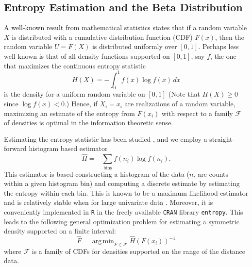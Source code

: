 \documentclass[12pt]{amsart}
\DeclareMathOperator*{\argmin}{arg\,min}
\renewcommand{\hat}{\widehat}
\begin{document}
\begin{multicols}{2}
\section{Entropy Estimation and the Beta Distribution} 
A well-known result from mathematical statistics states that if a random variable $X$ is distributed with a cumulative distribution function (CDF) $F(x)$, then the random variable $U=F(X)$ is distributed uniformly over $[0,1]$. 
Perhaps less well known is that of all density functions supported on $[0,1]$, say $f$, the one that maximizes the continuous entropy statistic 
\begin{equation}
  H(X) = -\int_{0}^1 f(x) \log f(x)\,dx
  \label{continuous_entropy}
\end{equation}
is the density for a uniform random variable on $[0,1]$ \cite{cover2006elements} (Note that $H(X)\ge0$ since $\log f(x) < 0$.)   
Hence, if $X_i=x_i$ are realizations of a random variable, maximizing an estimate of the entropy from $F(x_i)$ with respect to a family $\mathcal F$ of densities is optimal in the information theoretic sense.
 
Estimating the entropy statistic has been studied \cite{cover2006elements}, and we employ a straight-forward histogram based estimator
\begin{equation}
  \widehat H = -\sum_{\mathrm{bins}} f(n_i) \log f(n_i).
  \label{entropy}
\end{equation}
This estimator is based constructing a histogram of the data ($n_i$ are counts within a given histogram bin) and computing a discrete estimate by estimating the entropy within each bin.
This is known to be a maximum likelihood estimator and is relatively stable when for large univariate data \cite{cover2006elements}. 
Moreover, it is conveniently implemented in \texttt R in the freely available \texttt{CRAN} library \texttt{entropy}. 
This leads to the following general optimization problem for estimating a symmetric density supported on a finite interval:
\begin{equation}
  \hat F = \argmin_{F \in \mathcal F} \widehat H (F(x_i))^{-1}
\end{equation}
where $\mathcal F$ is a family of CDFs for densities supported on the range of the distance data. 


\end{multicols}
\end{document}

